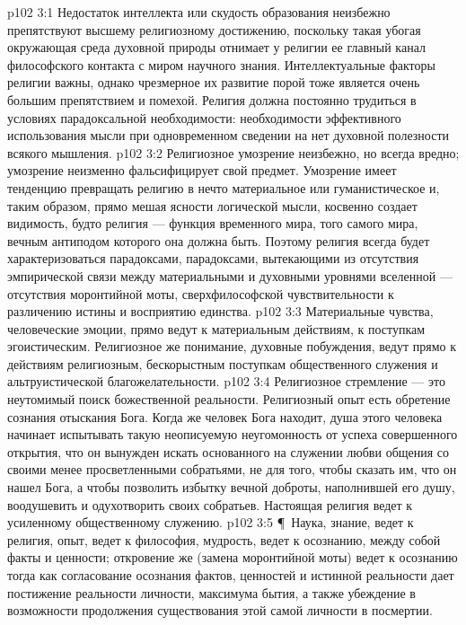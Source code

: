 \vs p102 3:1 Недостаток интеллекта или скудость образования неизбежно препятствуют высшему религиозному достижению, поскольку такая убогая окружающая среда духовной природы отнимает у религии ее главный канал философского контакта с миром научного знания. Интеллектуальные факторы религии важны, однако чрезмерное их развитие порой тоже является очень большим препятствием и помехой. Религия должна постоянно трудиться в условиях парадоксальной необходимости: необходимости эффективного использования мысли при одновременном сведении на нет духовной полезности всякого мышления.
\vs p102 3:2 Религиозное умозрение неизбежно, но всегда вредно; умозрение неизменно фальсифицирует свой предмет. Умозрение имеет тенденцию превращать религию в нечто материальное или гуманистическое и, таким образом, прямо мешая ясности логической мысли, косвенно создает видимость, будто религия --- функция временного мира, того самого мира, вечным антиподом которого она должна быть. Поэтому религия всегда будет характеризоваться парадоксами, парадоксами, вытекающими из отсутствия эмпирической связи между материальными и духовными уровнями вселенной --- отсутствия моронтийной моты, сверхфилософской чувствительности к различению истины и восприятию единства.
\vs p102 3:3 Материальные чувства, человеческие эмоции, прямо ведут к материальным действиям, к поступкам эгоистическим. Религиозное же понимание, духовные побуждения, ведут прямо к действиям религиозным, бескорыстным поступкам общественного служения и альтруистической благожелательности.
\vs p102 3:4 Религиозное стремление --- это неутомимый поиск божественной реальности. Религиозный опыт есть обретение сознания отыскания Бога. Когда же человек Бога находит, душа этого человека начинает испытывать такую неописуемую неугомонность от успеха совершенного открытия, что он вынужден искать основанного на служении любви общения со своими менее просветленными собратьями, не для того, чтобы сказать им, что он нашел Бога, а чтобы позволить избытку вечной доброты, наполнившей его душу, воодушевить и одухотворить своих собратьев. Настоящая религия ведет к усиленному общественному служению.
\vs p102 3:5 \P\ Наука, знание, ведет к  религия, опыт, ведет к  философия, мудрость, ведет к осознанию,  между собой факты и ценности; откровение же (замена моронтийной моты) ведет к осознанию  тогда как согласование осознания фактов, ценностей и истинной реальности дает постижение реальности личности, максимума бытия, а также убеждение в возможности продолжения существования этой самой личности в посмертии.
